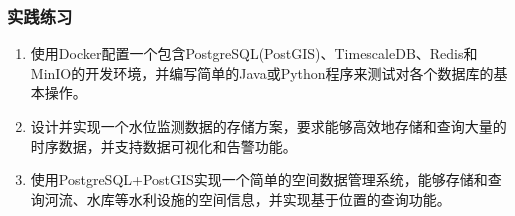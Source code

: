 \subsubsection{实践练习}\label{ux5b9eux8df5ux7ec3ux4e60}

\begin{enumerate}
\def\labelenumi{\arabic{enumi}.}
\item
  使用Docker配置一个包含PostgreSQL(PostGIS)、TimescaleDB、Redis和MinIO的开发环境，并编写简单的Java或Python程序来测试对各个数据库的基本操作。
\item
  设计并实现一个水位监测数据的存储方案，要求能够高效地存储和查询大量的时序数据，并支持数据可视化和告警功能。
\item
  使用PostgreSQL+PostGIS实现一个简单的空间数据管理系统，能够存储和查询河流、水库等水利设施的空间信息，并实现基于位置的查询功能。
\end{enumerate}
